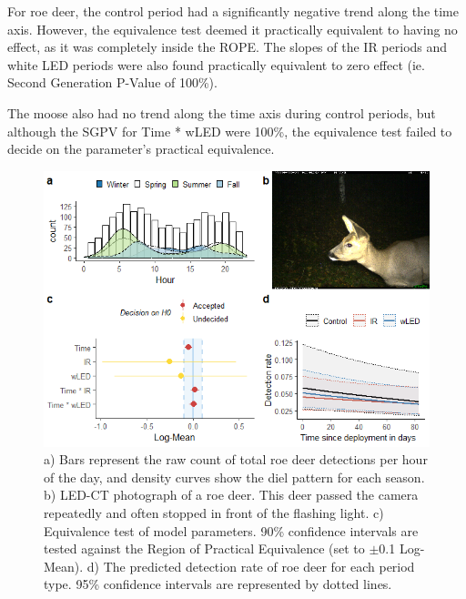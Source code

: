 For roe deer, the control period had a significantly negative trend along the time axis. However, the equivalence test deemed it practically equivalent to having no effect, as it was completely inside the ROPE. The slopes of the IR periods and white LED periods were also found practically equivalent to zero effect (ie. Second Generation P-Value of 100\%).

The moose also had no trend along the time axis during control periods, but although the SGPV for Time * wLED were 100\%, the equivalence test failed to decide %
on the parameter’s practical equivalence. %


\begin{figure}[b]
\centering
	\includegraphics[width=13cm]{../R/glmm_sp_files/figure-html/parameters-1.png}
\caption[Roe deer]
{\footnotesize %
a) Bars represent the raw count of total roe deer detections per hour of the day, and density curves show the diel pattern for each season.
b) LED-CT photograph of a roe deer. This deer passed the camera repeatedly and often stopped in front of the flashing light.
c) Equivalence test of model parameters. 90\% confidence intervals are tested against the Region of Practical Equivalence (set to $\pm$0.1 Log-Mean).
d) The predicted detection rate of roe deer for each period type. 95\% confidence intervals are represented by dotted lines.}
\label{raadyr}
\end{figure}

